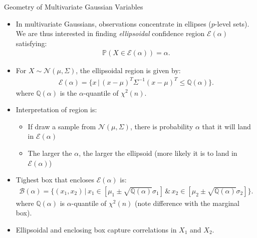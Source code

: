 \documentclass[9pt]{beamer}
\begin{document}
%
\begin{frame}{Geometry of Multivariate Gaussian Variables}

\begin{itemize}
\item  In multivariate Gaussians, observations concentrate in ellipses ($p$-level sets). We are thus interested in finding {\em ellipsoidal} confidence region $\mathcal{E}(\alpha)$ satisfying:
\begin{align*}
\mathbb{P}(X\in \mathcal{E}(\alpha))=\alpha.
\end{align*}
\item For $X\sim \mathcal{N}(\mu,\Sigma)$, the ellipsoidal region is given by:
\begin{align*}
\mathcal{E}(\alpha)=\{x\,|\,(x-\mu)^T\Sigma^{-1}(x-\mu)^T\leq \mathbb{Q}(\alpha)\}.
\end{align*}
where $\mathbb{Q}(\alpha)$ is the $\alpha$-quantile of $\chi^2(n)$.  
\item  Interpretation of region is:
\begin{itemize}
\item If draw a sample from $\mathcal{N}(\mu,\Sigma)$, there is probability $\alpha$ that it will land in $\mathcal{E}(\alpha)$
\item The larger the $\alpha$, the larger the ellipsoid (more likely it is to land in $\mathcal{E}(\alpha)$)
\end{itemize}
\item Tighest box that encloses $\mathcal{E}(\alpha)$ is:
\begin{align*}
\mathcal{B}(\alpha)=\{(x_1,x_2)\,|\,x_1\in [\mu_1\pm \sqrt{\mathbb{Q}(\alpha)}\sigma_1]\,\&\,x_2\in [\mu_2\pm \sqrt{\mathbb{Q}(\alpha)}\sigma_2]\}.
\end{align*}
where $\mathbb{Q}(\alpha)$ is  $\alpha$-quantile of $\chi^2(n)$ (note difference with the marginal box). 
\item Ellipsoidal and enclosing box capture correlations in $X_1$ and $X_2$.
\end{itemize}

\end{frame}
\end{document}
